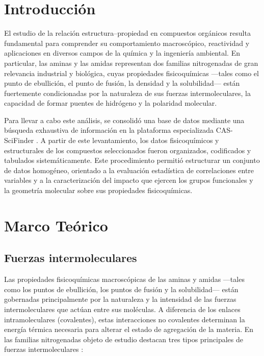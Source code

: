 %

\section{Introducción}
\fontsize{12}{14}\selectfont
El estudio de la relación estructura--propiedad en compuestos orgánicos resulta
fundamental para comprender su comportamiento macroscópico, reactividad y
aplicaciones en diversos campos de la química y la ingeniería ambiental. En
particular, las aminas y las amidas representan dos familias nitrogenadas de gran
relevancia industrial y biológica, cuyas propiedades fisicoquímicas ---tales como
el punto de ebullición, el punto de fusión, la densidad y la solubilidad--- están
fuertemente condicionadas por la naturaleza de sus fuerzas intermoleculares, la
capacidad de formar puentes de hidrógeno y la polaridad molecular.

Para llevar a cabo este análisis, se consolidó una base de datos mediante una
búsqueda exhaustiva de información en la plataforma especializada CAS-SciFinder
\cite{1_Su2022}. A partir de este levantamiento, los datos fisicoquímicos y
estructurales de los compuestos seleccionados fueron organizados, codificados y
tabulados sistemáticamente. Este procedimiento permitió estructurar un conjunto de
datos homogéneo, orientado a la evaluación estadística de correlaciones entre
variables y a la caracterización del impacto que ejercen los grupos funcionales y
la geometría molecular sobre sus propiedades fisicoquímicas.

\section{Marco Teórico}
\fontsize{12}{14}\selectfont

\subsection{Fuerzas intermoleculares}
Las propiedades fisicoquímicas macroscópicas de las aminas y amidas ---tales como
los puntos de ebullición, los puntos de fusión y la solubilidad--- están
gobernadas principalmente por la naturaleza y la intensidad de las fuerzas
intermoleculares que actúan entre sus moléculas. A diferencia de los enlaces
intramoleculares (covalentes), estas interacciones no covalentes determinan la
energía térmica necesaria para alterar el estado de agregación de la materia. En
las familias nitrogenadas objeto de estudio destacan tres tipos principales de
fuerzas intermoleculares \cite{wade2017}:


